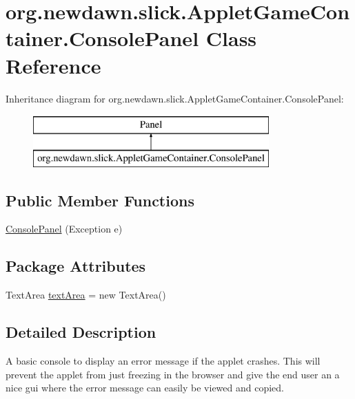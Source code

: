 \hypertarget{classorg_1_1newdawn_1_1slick_1_1_applet_game_container_1_1_console_panel}{}\section{org.\+newdawn.\+slick.\+Applet\+Game\+Container.\+Console\+Panel Class Reference}
\label{classorg_1_1newdawn_1_1slick_1_1_applet_game_container_1_1_console_panel}
Inheritance diagram for org.\+newdawn.\+slick.\+Applet\+Game\+Container.\+Console\+Panel\+:\begin{figure}[H]
\begin{center}
\leavevmode
\includegraphics[height=2.000000cm]{classorg_1_1newdawn_1_1slick_1_1_applet_game_container_1_1_console_panel}
\end{center}
\end{figure}
\subsection*{Public Member Functions}
\begin{DoxyCompactItemize}
\item 
\mbox{\hyperlink{classorg_1_1newdawn_1_1slick_1_1_applet_game_container_1_1_console_panel_aa4b984a07ff3e137cb6a86d01907efa6}{Console\+Panel}} (Exception e)
\end{DoxyCompactItemize}
\subsection*{Package Attributes}
\begin{DoxyCompactItemize}
\item 
Text\+Area \mbox{\hyperlink{classorg_1_1newdawn_1_1slick_1_1_applet_game_container_1_1_console_panel_af71b345c0d2ac0773ca77f00e01d4af2}{text\+Area}} = new Text\+Area()
\end{DoxyCompactItemize}


\subsection{Detailed Description}
A basic console to display an error message if the applet crashes. This will prevent the applet from just freezing in the browser and give the end user an a nice gui where the error message can easily be viewed and copied. 

